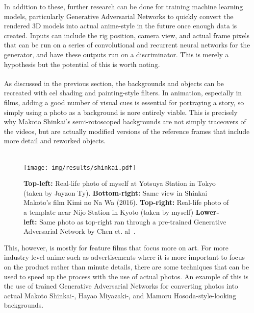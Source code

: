 In addition to these, further research can be done for training machine learning models, particularly Generative Adversarial Networks to quickly convert the rendered 3D models into actual anime-style in the future once enough data is created. Inputs can include the rig position, camera view, and actual frame pixels that can be run on a series of convolutional and recurrent neural networks for the generator, and have these outputs run on a discriminator. This is merely a hypothesis but the potential of this is worth noting.\\\\
As discussed in the previous section, the backgrounds and objects can be recreated with cel shading and painting-style filters. In animation, especially in films, adding a good number of visual cues is essential for portraying a story, so simply using a photo as a background is nore entirely viable. This is precisely why Makoto Shinkai's semi-rotoscoped backgrounds are not simply traceovers of the videos, but are actually modified versions of the reference frames that include more detail and reworked objects.\\\\

\begin{figure}[t]
    \centering
    \texttt{[image: img/results/shinkai.pdf]} \\
    \caption{\textbf{Top-left:} {{Real-life photo of myself at Yotsuya Station in Tokyo (taken by Jayzon Ty)}}. \textbf{Bottom-right:} Same view in Shinkai Makoto's film Kimi no Na Wa (2016). \textbf{Top-right:} {{Real-life photo of a template near Nijo Station in Kyoto (taken by myself)} \textbf{Lower-left:} {{Same photo as top-right ran through a pre-trained Generative Adversarial Network by Chen et. al~\cite{cartoonGAN}}}.}}
    \vspace{-15pt}
    \label{fig:shinkai}
\end{figure}

This, however, is mostly for feature films that focus more on art. For more industry-level anime such as advertisements where it is more important to focus on the product rather than minute details, there are some techniques that can be used to speed up the process with the use of actual photos. An example of this is the use of trained Generative Adversarial Networks for converting photos into actual Makoto Shinkai-, Hayao Miyazaki-, and Mamoru Hosoda-style-looking backgrounds.\\\\

